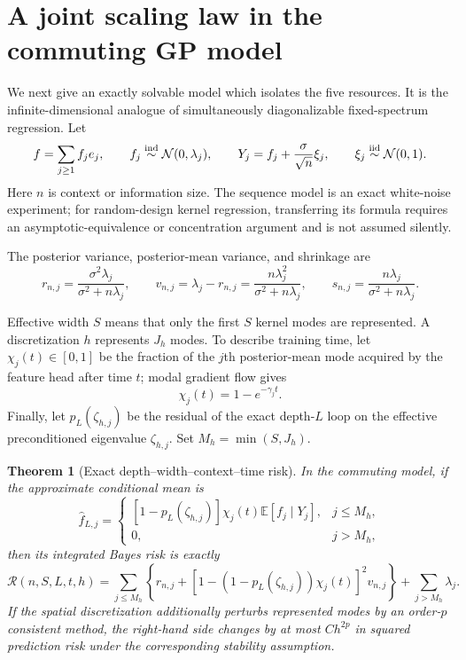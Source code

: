 \documentclass[11pt,a4paper]{article}
\numberwithin{equation}{section}
\newtheorem{theorem}{Theorem}[section]
\theoremstyle{definition}
\theoremstyle{remark}
\newcommand{\E}{\mathbb E}
\newcommand{\calR}{\mathcal R}
\newcommand{\wh}{\widehat}
\begin{document}
\section{A joint scaling law in the commuting GP model}
\label{sec:scaling}

We next give an exactly solvable model which isolates the five resources.  It
is the infinite-dimensional analogue of simultaneously diagonalizable
fixed-spectrum regression.  Let
\begin{equation}
 f=\sum_{j\ge1}f_je_j,\qquad
 f_j\stackrel{\rm ind}{\sim}\mathcal N(0,\lambda_j),
 \qquad
 Y_j=f_j+\frac{\sigma}{\sqrt n}\xi_j,\qquad
 \xi_j\stackrel{\rm iid}{\sim}\mathcal N(0,1).
 \label{eq:sequence-model}
\end{equation}
Here $n$ is context or information size.  The sequence model is an exact
white-noise experiment; for random-design kernel regression, transferring its
formula requires an asymptotic-equivalence or concentration argument and is
not assumed silently.

The posterior variance, posterior-mean variance, and shrinkage are
\begin{equation}
 r_{n,j}=\frac{\sigma^2\lambda_j}{\sigma^2+n\lambda_j},
 \qquad
 v_{n,j}=\lambda_j-r_{n,j}
 =\frac{n\lambda_j^2}{\sigma^2+n\lambda_j},
 \qquad
 s_{n,j}=\frac{n\lambda_j}{\sigma^2+n\lambda_j}.
 \label{eq:modal-quantities}
\end{equation}

Effective width $S$ means that only the first $S$ kernel modes are represented.
A discretization $h$ represents $J_h$ modes.  To describe training time, let
$\chi_j(t)\in[0,1]$ be the fraction of the $j$th posterior-mean mode acquired
by the feature head after time $t$; modal gradient flow gives
\begin{equation}
 \chi_j(t)=1-e^{-\gamma_jt}.
 \label{eq:modal-training}
\end{equation}
Finally, let $p_L(\zeta_{h,j})$ be the residual of the exact depth-$L$ loop on
the effective preconditioned eigenvalue $\zeta_{h,j}$.  Set
$M_h=\min(S,J_h)$.

\begin{theorem}[Exact depth--width--context--time risk]
\label{thm:master-risk}
In the commuting model, if the approximate conditional mean is
\begin{equation}
 \wh f_{L,j}=
 \begin{cases}
 [1-p_L(\zeta_{h,j})]\chi_j(t)\E[f_j\mid Y_j],&j\le M_h,\\
 0,&j>M_h,
 \end{cases}
 \label{eq:approximate-estimator}
\end{equation}
then its integrated Bayes risk is exactly
\begin{equation}
 \calR(n,S,L,t,h)
 =\sum_{j\le M_h}
 \left\{
 r_{n,j}
 +\left[1-(1-p_L(\zeta_{h,j}))\chi_j(t)\right]^2v_{n,j}
 \right\}
 +\sum_{j>M_h}\lambda_j.
 \label{eq:master-risk}
\end{equation}
If the spatial discretization additionally perturbs represented modes by an
order-$p$ consistent method, the right-hand side changes by at most
$C h^{2p}$ in squared prediction risk under the corresponding stability
assumption.
\end{theorem}
\end{document}
